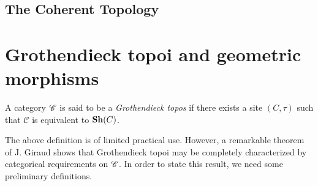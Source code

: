 
\subsection{The Coherent Topology}


\section{Grothendieck topoi and geometric morphisms}
\begin{defi}
	A category $\mathscr{C}$ is said to be a \textit{Grothendieck topos} if there exists a site $(C,\tau)$ such that $\mathcal{C}$ is equivalent to ${\normalfont\textbf{Sh}}(C)$. 
\end{defi}
The above definition is of limited practical use. However, a remarkable theorem of J. Giraud shows that Grothendieck topoi may be completely characterized by categorical requirements on $\mathscr{C}$. In order to state this result, we need some preliminary definitions.